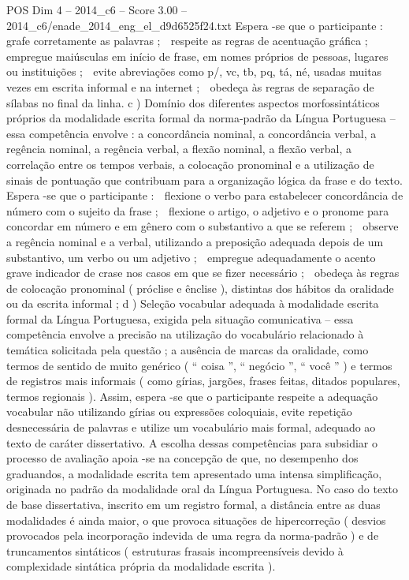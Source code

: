 \begin{textsample}{POS Dim 4 – 2014\_c6 – Score 3.00 – 2014\_c6/enade\_2014\_eng\_el\_d9d6525f24.txt}
Espera -se que o participante :  grafe corretamente as palavras ;  respeite as regras de acentuação gráfica ;  empregue maiúsculas em início de frase, em nomes próprios de pessoas, lugares ou instituições ;  evite abreviações como p/, vc, tb, pq, tá, né, usadas muitas vezes em escrita informal e na internet ;  obedeça às regras de separação de sílabas no final da linha. c ) Domínio dos diferentes aspectos morfossintáticos próprios da modalidade escrita formal da norma-padrão da Língua Portuguesa – essa competência envolve : a concordância nominal, a concordância verbal, a regência nominal, a regência verbal, a flexão nominal, a flexão verbal, a correlação entre os tempos verbais, a colocação pronominal e a utilização de sinais de pontuação que contribuam para a organização lógica da frase e do texto.
Espera -se que o participante :  flexione o verbo para estabelecer concordância de número com o sujeito da frase ;  flexione o artigo, o adjetivo e o pronome para concordar em número e em gênero com o substantivo a que se referem ;  observe a regência nominal e a verbal, utilizando a preposição adequada depois de um substantivo, um verbo ou um adjetivo ;  empregue adequadamente o acento grave indicador de crase nos casos em que se fizer necessário ;  obedeça às regras de colocação pronominal ( próclise e ênclise ), distintas dos hábitos da oralidade ou da escrita informal ; d ) Seleção vocabular adequada à modalidade escrita formal da Língua Portuguesa, exigida pela situação comunicativa – essa competência envolve a precisão na utilização do vocabulário relacionado à temática solicitada pela questão ; a ausência de marcas da oralidade, como termos de sentido de muito genérico ( “ coisa ”, “ negócio ”, “ você ” ) e termos de registros mais informais ( como gírias, jargões, frases feitas, ditados populares, termos regionais ).
Assim, espera -se que o participante respeite a adequação vocabular não utilizando gírias ou expressões coloquiais, evite repetição desnecessária de palavras e utilize um vocabulário mais formal, adequado ao texto de caráter dissertativo.
A escolha dessas competências para subsidiar o processo de avaliação apoia -se na concepção de que, no desempenho dos graduandos, a modalidade escrita tem apresentado uma intensa simplificação, originada no padrão da modalidade oral da Língua Portuguesa.
No caso do texto de base dissertativa, inscrito em um registro formal, a distância entre as duas modalidades é ainda maior, o que provoca situações de hipercorreção ( desvios provocados pela incorporação indevida de uma regra da norma-padrão ) e de truncamentos sintáticos ( estruturas frasais incompreensíveis devido à complexidade sintática própria da modalidade escrita ).

\end{textsample}

